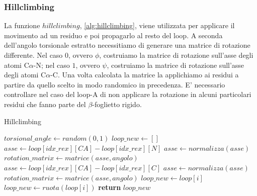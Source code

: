 \subsubsection{Hillclimbing}\label{subsubsec:hillclimbing}
La funzione $hillclimbing$, \ref{alg:hillclimbing}, viene utilizzata per applicare il movimento ad un residuo e poi propagarlo al resto del loop. A seconda dell'angolo torsionale estratto necessitiamo di generare una matrice di rotazione differente. Nel caso $0$, ovvero $\phi$, costruiamo la matrice di rotazione sull'asse degli atomi C$\alpha$-N; nel caso $1$, ovvero $\psi$, costruiamo la matrice di rotazione sull'asse degli atomi C$\alpha$-C. Una volta calcolata la matrice la applichiamo ai residui a partire da quello scelto in modo randomico in precedenza. E' necessario controllare nel caso del loop-A di non applicare la rotazione in alcuni particolari residui che fanno parte del $\beta$-foglietto rigido. 
\begin{algorithm}[H]
	\caption{Hillclimbing}
	\label{alg:hillclimbing}
	\begin{algorithmic}
		\State $torsional\_angle \gets random(0,1)$
		\State $loop\_new \gets []$
		\State $asse \gets loop[idx\_rex][CA] - loop[idx\_rex][N]$
		\State $asse \gets normalizza(asse)$ 
		\State $rotation\_matrix \gets matrice(asse, angolo)$
		\Else
		\State $asse \gets loop[idx\_rex][CA] - loop[idx\_rex][C]$
		\State $asse \gets normalizza(asse)$ 
		\State $rotation\_matrix \gets matrice(asse, angolo)$
		\EndIf
		\State $loop\_new \gets loop[i]$
		\EndFor
		\State $loop\_new \gets ruota(loop[i])$
		\EndFor 
		\State \textbf{return} $loop\_new$
		\EndFunction
	\end{algorithmic}
\end{algorithm}
